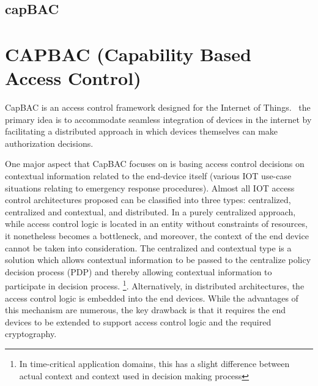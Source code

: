 \subsection{capBAC}
\label{subsec:capbacsystem}

\section{CAPBAC (Capability Based Access Control)}
CapBAC is an access control framework designed for the Internet of Things.~\cite{hernandez2013distributed} the primary idea is to accommodate seamless integration of devices in the internet by facilitating a distributed approach in which devices themselves can make authorization decisions.

One major aspect that CapBAC focuses on is basing access control decisions on contextual information related to the end-device itself (various IOT use-case situations relating to emergency response procedures). Almost all IOT access control architectures proposed can be classified into three types: centralized, centralized and contextual, and distributed. In a purely centralized approach, while access control logic is located in an entity without constraints of resources, it nonetheless becomes a bottleneck, and moreover, the context of the end device cannot be taken into consideration. The centralized and contextual type is a solution which allows contextual information to be passed to the centralize policy decision process (PDP) and thereby allowing contextual information to participate in decision process. \footnote{In time-critical application domains, this has a slight difference between actual context and context used in decision making process}. Alternatively, in distributed architectures, the access control logic is embedded into the end devices. While the advantages of this mechanism are numerous, the key drawback is that it requires the end devices to be extended to support access control logic and the required cryptography.


